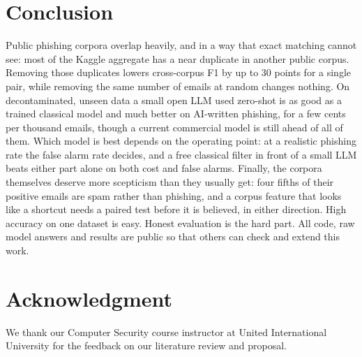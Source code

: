\section{Conclusion}

Public phishing corpora overlap heavily, and in a way that exact matching
cannot see: most of the Kaggle aggregate has a near duplicate in another public
corpus. Removing those duplicates lowers cross-corpus F1 by up to 30 points for
a single pair, while removing the same number of emails at random changes
nothing. On decontaminated, unseen data a small open LLM used zero-shot is as
good as a trained classical model and much better on AI-written phishing, for a
few cents per thousand emails, though a current commercial model is still
ahead of all of them. Which model is best depends on the operating point: at a
realistic phishing rate the false alarm rate decides, and a free classical
filter in front of a small LLM beats either part alone on both cost and false
alarms. Finally, the corpora themselves deserve more scepticism than they
usually get: four fifths of their positive emails are spam rather than
phishing, and a corpus feature that looks like a shortcut needs a paired test
before it is believed, in either direction.
High accuracy on one dataset is easy. Honest evaluation is the hard part. All
code, raw model answers and results are public so that others can check and
extend this work.

\section*{Acknowledgment}
We thank our Computer Security course instructor at United International
University for the feedback on our literature review and proposal.
